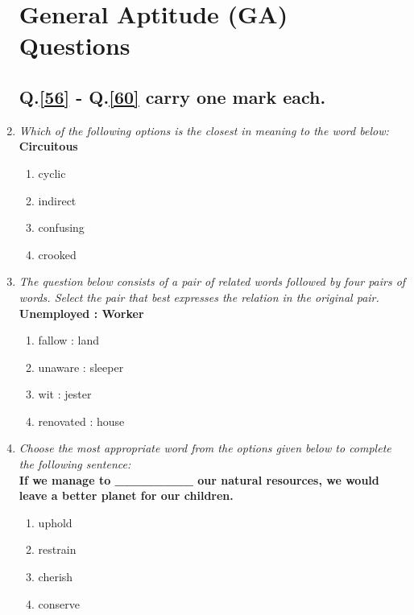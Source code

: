 \documentclass[journal]{IEEEtran}
\begin{document}
\begin{enumerate}
        \section*{General Aptitude (GA) Questions}
        \subsection*{Q.\ref{56} - Q.\ref{60} carry one mark each.}

        \item\label{56} \textit{Which of the following options is the closest in meaning to the word below:} \\ \textbf{Circuitous}
            \begin{enumerate}
                \item cyclic
                \item indirect
                \item confusing
                \item crooked
            \end{enumerate}

            \item \textit{The question below consists of a pair of related words followed by four pairs of words. Select the pair that best expresses the relation in the original pair.} \\
            \textbf{Unemployed : Worker}
            \begin{enumerate}
                \item fallow : land
                \item unaware : sleeper
                \item wit : jester
                \item renovated : house
            \end{enumerate}
    
            \item \textit{Choose the most appropriate word from the options given below to complete the following sentence:} \\
            \textbf{If we manage to \_\_\_\_\_\_\_\_ our natural resources, we would leave a better planet for our children.}
            \begin{enumerate}
                \item uphold
                \item restrain
                \item cherish
                \item conserve
            \end{enumerate}


\end{enumerate}
\end{document}
